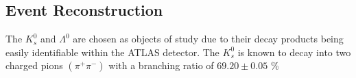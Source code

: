 \documentclass{article}
\begin{document}
\subsection{Event Reconstruction}
The $K^0_s$ and $\Lambda^0$ are chosen as objects of study due to their decay products being easily 
identifiable within the ATLAS detector. The $K^0_s$ is known to decay into two charged pions $(\pi^+\pi^-)$
with a branching ratio of $69.20 \pm 0.05$ \unit{\%} \cite{KBranchingRatio} 

  
 
\end{document}
